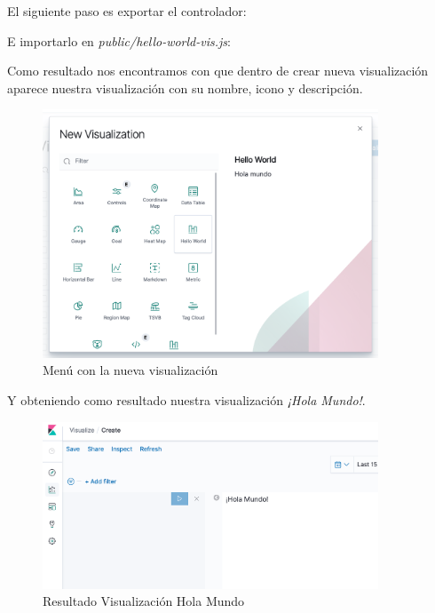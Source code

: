 \documentclass[a4paper, 12pt]{book}
\begin{document}
El siguiente paso es exportar el controlador:



E importarlo en \textit{public/hello-world-vis.js}:



Como resultado nos encontramos con que dentro de crear nueva visualización aparece nuestra visualización con su nombre, icono y descripción.

\begin{figure}[H]
  \centering
  \includegraphics[width=10cm, keepaspectratio]{img/development/menu-visualizaciones.png}
  \caption{Menú con la nueva visualización}
  \label{fig:menuvisualization}
\end{figure}

Y obteniendo como resultado nuestra visualización \textit{¡Hola Mundo!}.

\begin{figure}[H]
  \centering
  \includegraphics[width=10cm, keepaspectratio]{img/development/resultado-hola-mundo.png}
  \caption{Resultado Visualización Hola Mundo}
  \label{fig:resultadoholamundo}
\end{figure}
\end{document}
